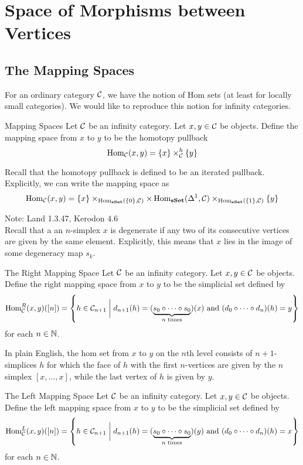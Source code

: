 \documentclass[a4paper]{article}
\begin{document}
\pagebreak
\section{Space of Morphisms between Vertices}
\subsection{The Mapping Spaces}
For an ordinary category $\mathcal{C}$, we have the notion of Hom sets (at least for locally small categories). We would like to reproduce this notion for infinity categories. 

\begin{defn}{Mapping Spaces}{} Let $\mathcal{C}$ be an infinity category. Let $x,y\in\mathcal{C}$ be objects. Define the mapping space from $x$ to $y$ to be the homotopy pullback $$\operatorname{Hom}_{\mathcal{C}}(x,y)=\{x\}\times_{\mathcal{C}}^h\{y\}$$
\end{defn}

Recall that the homotopy pullback is defined to be an iterated pullback. Explicitly, we can write the mapping space as $$\operatorname{Hom}_{\mathcal{C}}(x,y)=\{x\}\times_{\operatorname{Hom}_\bold{sSet}(\{0\},\mathcal{C})}\times\operatorname{Hom}_\bold{sSet}(\Delta^1,\mathcal{C})\times_{\operatorname{Hom}_\bold{sSet}(\{1\},\mathcal{C})}\{y\}$$

Note: Land 1.3.47, Kerodon 4.6\\

Recall that a an $n$-simplex $x$ is degenerate if any two of its consecutive vertices are given by the same element. Explicitly, this means that $x$ lies in the image of some degeneracy map $s_k$. 

\begin{defn}{The Right Mapping Space}{} Let $\mathcal{C}$ be an infinity category. Let $x,y\in\mathcal{C}$ be objects. Define the right mapping space from $x$ to $y$ to be the simplicial set defined by $$\operatorname{Hom}_{\mathcal{C}}^R(x,y)([n])=\left\{h\in\mathcal{C}_{n+1}\;\bigg{|}\;d_{n+1}(h)=(\underbrace{s_0\circ\cdots\circ s_0}_{n\text{ times}})(x)\text{ and }(d_0\circ\cdots\circ d_n)(h)=y\right\}$$ for each $n\in\mathbb{N}$. 
\end{defn}

In plain English, the hom set from $x$ to $y$ on the $n$th level consists of $n+1$-simplices $h$ for which the face of $h$ with the first $n$-vertices are given by the $n$ simplex $[x,\dots,x]$, while the last vertex of $h$ is given by $y$. 

\begin{defn}{The Left Mapping Space}{} Let $\mathcal{C}$ be an infinity category. Let $x,y\in\mathcal{C}$ be objects. Define the left mapping space from $x$ to $y$ to be the simplicial set defined by $$\operatorname{Hom}_{\mathcal{C}}^L(x,y)([n])=\left\{h\in\mathcal{C}_{n+1}\;\bigg{|}\;d_{n+1}(h)=(\underbrace{s_0\circ\cdots\circ s_0}_{n\text{ times}})(y)\text{ and }(d_0\circ\cdots\circ d_n)(h)=x\right\}$$ for each $n\in\mathbb{N}$. 
\end{defn}
\end{document}
